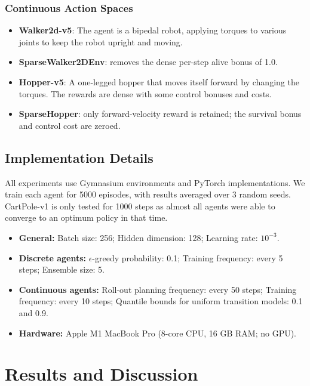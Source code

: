 \documentclass[11pt,a4paper]{report}
\begin{document}
\subsection{Continuous Action Spaces}
\begin{itemize}
  \item \textbf{Walker2d-v5}: The agent is a bipedal robot, applying torques to various joints to keep the robot upright and moving.
  \item \textbf{SparseWalker2DEnv}: removes the dense per-step alive bonus of 1.0.
  \item \textbf{Hopper-v5}: A one-legged hopper that moves itself forward by changing the torques. The rewards are dense with some control bonuses and costs.
  \item \textbf{SparseHopper}: only forward-velocity reward is retained; the survival bonus and control cost are zeroed.
\end{itemize}

\section{Implementation Details}
All experiments use Gymnasium environments and PyTorch implementations. We train each agent for 5000 episodes, with results averaged over 3 random seeds. CartPole-v1 is only tested for 1000 steps as almost all agents were able to converge to an optimum policy in that time.

\begin{itemize}
  \item \textbf{General:} Batch size: 256; Hidden dimension: 128; Learning rate: \(10^{-3}\).
  \item \textbf{Discrete agents:} \(\epsilon\)-greedy probability: 0.1; Training frequency: every 5 steps; Ensemble size: 5.
  \item \textbf{Continuous agents:} Roll-out planning frequency: every 50 steps; Training frequency: every 10 steps; Quantile bounds for uniform transition models: 0.1 and 0.9. 
  \item \textbf{Hardware:} Apple M1 MacBook Pro (8-core CPU, 16 GB RAM; no GPU).
\end{itemize}
\chapter{Results and Discussion}
\label{chapter:rd}
\end{document}
